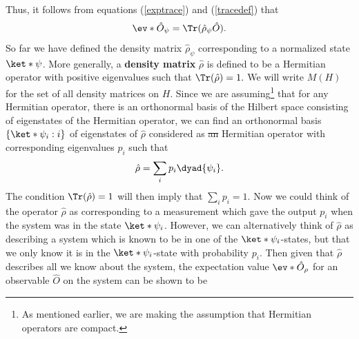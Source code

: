 \documentclass[12pt]{report}
\providecommand{\DIFadd}[1]{{\protect\color{blue}\uwave{#1}}} %
\providecommand{\DIFdel}[1]{{\protect\color{red}\sout{#1}}}                      %
\providecommand{\DIFaddbegin}{} %
\providecommand{\DIFaddend}{} %
\providecommand{\DIFdelbegin}{} %
\providecommand{\DIFdelend}{} %
\begin{document}
    Thus, it follows from equations (\ref{exptrace}) and (\ref{tracedef}) that 
    \begin{equation}
    \ev*{\hat{O}}_\psi=\Tr (\hat{\rho}_\psi\hat{O}\label{traceev}).
    \end{equation}
     So far we have defined the density matrix $\hat{\rho}_\psi$ corresponding to a normalized state $\ket*{\psi}$. More generally, a \textbf{density matrix} $\hat{\rho}$  %
% 
     is defined to be a Hermitian operator with positive eigenvalues such that $\Tr(\hat{\rho})=1.$ We will write $M(H)$   %
% 
for the set of all density matrices on $H$. Since we are assuming\footnote{As mentioned earlier, we are making the assumption that Hermitian operators are compact.} that for any Hermitian operator, there is an orthonormal basis of the Hilbert space consisting of eigenstates of the Hermitian operator, we can find an orthonormal basis $\{\ket*{\psi_i}:i\}$ of eigenstates of $\hat{\rho}$ considered as \DIFdelbegin \DIFdel{an }\DIFdelend \DIFaddbegin \DIFadd{a }\DIFaddend Hermitian operator with corresponding eigenvalues $p_i$ such that 
    \begin{equation}\label{rhodiag}
    \hat{\rho}=\sum_i p_i\dyad{\psi_i}.
    \end{equation} 
    The condition $\Tr(\hat{\rho})=1$ will then imply that $\sum_i p_i =1$. Now we could think of the operator $\hat{\rho}$ as corresponding to a measurement which gave the output $p_i$ when the system was in the state $\ket*{\psi_i}$. However, we can alternatively think of $\hat{\rho}$ as describing a system which is known to be in one of the $\ket*{\psi_i}$-states, but that we only know it is in the $\ket*{\psi_i}$-state with probability $p_i$. Then given that $\hat{\rho}$ describes all we know about the system, the expectation value $\ev*{\hat{O}}_\rho$ for an observable $\hat{O}$ on the system can be shown to be    %
\DIFdelbegin %
\DIFdelend \DIFaddbegin {}\DIFaddend %
\end{document}
